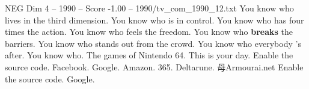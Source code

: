 \begin{textsample}{NEG Dim 4 – 1990 – Score -1.00 – 1990/tv\_com\_1990\_12.txt}  \label{ex:f4_neg_079}
You know who lives in the third dimension.
You know who is in control.
You know who has four times the action.
You know who feels the freedom.
You know who \textbf{breaks} the barriers.
You know who stands out from the crowd.
You know who everybody 's after.
You know who.
The games of Nintendo 64.
This is your day.
Enable the source code.
Facebook.
Google.
Amazon. 365.
Deltarune. 母Armourai.net Enable the source code.
Google.

\end{textsample}
